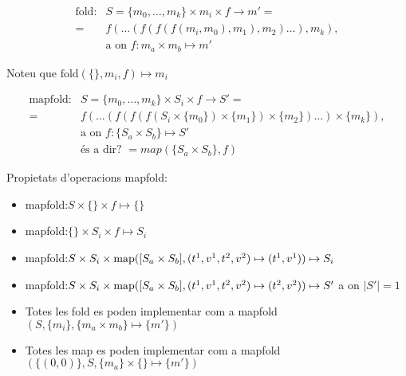 \begin{align*}
  \text{fold}: & S=\{m_0,\dotsc,m_k\} \times m_i \times f \longrightarrow m'= \\
               =& f(\dots(f(f(f(m_i,m_0),m_1),m_2)\dots),m_k), \\
               & \text{a on } f: m_a \times m_b \mapsto m'
\end{align*}


Noteu que $\text{fold}(\{\},m_i,f) \mapsto m_i$ 







\begin{align*}
  \text{mapfold}: & S=\{m_0,\dotsc,m_k\} \times S_i \times f \longrightarrow S'= \\
                 =& f(\dots(f(f(f(S_i\times\{m_0\})\times\{m_1\})\times\{m_2\})\dots)\times\{m_k\}), \\
                  & \text{a on } f: \{S_a \times S_b \}\mapsto S'\\
                  & \text{és a dir? } =map( \{S_a \times S_b \},f)
\end{align*}



Propietats d'operacions mapfold:
\begin{itemize}
\item mapfold:$S \times \{\} \times f \mapsto \{\}$ 

\item mapfold:$\{\} \times S_i \times f \mapsto S_i$ 

\item mapfold:$S \times S_i \times
  \operatorname*{map}([S_a\times S_b],(t^1,v^1,t^2,v^2)\mapsto(t^1,v^1)) \mapsto S_i$

\item mapfold:$S \times S_i \times \operatorname*{map}([S_a\times
  S_b],(t^1,v^1,t^2,v^2)\mapsto(t^2,v^2)) \mapsto S'$ a on $|S'|=1$

\item Totes les fold es poden implementar com a mapfold$(S,\{m_i\},
  \{m_a \times m_b\} \mapsto \{m'\})$

\item Totes les map es poden implementar com a mapfold$(\{(0,0)\},S,
  \{m_a\} \times  \{\} \mapsto \{m'\})$
\end{itemize}



